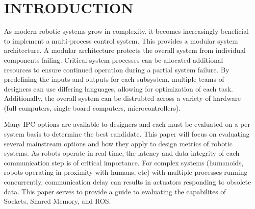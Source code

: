 \section{INTRODUCTION}

As modern robotic systems grow in complexity, it becomes increasingly beneficial to implement a multi-process control system. This provides a modular system architecture. A modular architecture protects the overall system from individual components failing. Critical system processes can be allocated additional resources to ensure continued operation during a partial system failure. By predefining the inputs and outputs for each subsystem, multiple teams of designers can use differing languages, allowing for optimization of each task. Additionally, the overall system can be distrubted across a variety of hardware (full computers, single board computers, microcontrollers). 

Many IPC options are available to designers and each must be evaluated on a per system basis to determine the best candidate. This paper will focus on evaluating several mainstream options and how they apply to design metrics of robotic systems. As robots operate in real time, the latency and data integrity of each communication step is of critical importance. For complex systems (humanoids, robots operating in proximity with humans, etc) with multiple processes running concurrently, communication delay can results in actuators responding to obsolete data. This paper serves to provide a guide to evaluating the capabilites of Sockets, Shared Memory, and ROS. 
